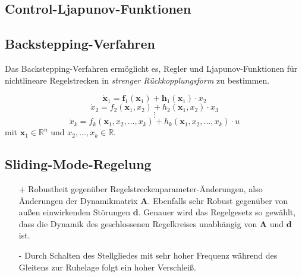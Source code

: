 		
	\subsection{Control-Ljapunov-Funktionen}
	\subsection{Backstepping-Verfahren}
		Das Backstepping-Verfahren ermöglicht es, Regler und Ljapunov-Funktionen für nichtlineare Regelstrecken in \textit{strenger Rückkopplungsform} zu bestimmen.
		\begin{tcolorbox}[title=Definition: \textit{System vom Typ strenger Rückkopplungsform (engl. strict feedback)}]
			\[\dot{\bm{x}}_{1} = \bm{f}_{1}(\bm{x}_{1})+\bm{h}_{1}(\bm{x}_{1})\cdot x_{2}\]
			\[\dot{x}_{2}= f_{2}(\bm{x}_{1},x_{2})+h_{2}(\bm{x}_{1},x_{2})\cdot x_{3}\]
			\[\vdots\]
			\[\dot{x}_{k}= f_{k}(\bm{x}_{1},x_{2},...,x_{k})+h_{k}(\bm{x}_{1},x_{2},...,x_{k})\cdot u\]
			mit $ \bm{x}_{1}\in \mathbb{R}^{n}$ und $ x_{2},...,x_{k} \in \mathbb{R}.$
		\end{tcolorbox}
	\subsection{Sliding-Mode-Regelung}
		\begin{itemize}
			\item[+] Robustheit gegenüber Regelstreckenparameter-Änderungen, also Änderungen der Dynamikmatrix $ \bm{A} $. Ebenfalls sehr Robust gegenüber von außen einwirkenden Störungen $ \bm{d} $. Genauer wird das Regelgesetz so gewählt, dass die Dynamik des geschlossenen Regelkreises unabhängig von $ \bm{A} $ und $ \bm{d} $ ist.
			\item[-] Durch Schalten des Stellgliedes mit sehr hoher Frequenz während des Gleitens zur Ruhelage folgt ein hoher Verschleiß.
		\end{itemize}
	
	
	
	
	
	
	\newpage
	
